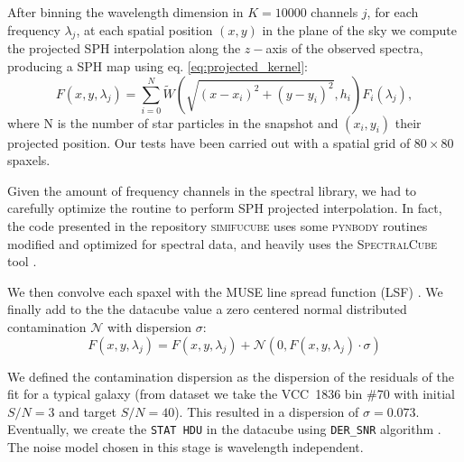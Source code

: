 After binning the wavelength dimension in $K=10000$ channels $j$, for each frequency $\lambda_j$, at each spatial position $(x,y)$ in the plane of the sky we compute the projected SPH interpolation along the $z-$axis of the observed spectra, producing a SPH map using eq. \eqref{eq:projected_kernel}:
\begin{equation}
  F(x,y, \lambda_j) = \sum_{i=0}^{N} \tilde{W} \left(\sqrt{(x-x_i)^2+(y-y_i)^2}, h_i \right) F_i(\lambda_j),
\end{equation}
where N is the number of star particles in the snapshot and $(x_i, y_i)$ their projected position.
Our tests have been carried out with a spatial grid of $80\times 80$ spaxels.

Given the amount of frequency channels in the spectral library, we had to carefully optimize the routine to perform SPH projected interpolation.
In fact, the code presented in the repository \textsc{simifucube} \citep{simifucube} uses some \textsc{pynbody} \citep{Pontzen2013} routines modified and optimized for spectral data, and heavily uses the \textsc{SpectralCube} tool \citep{SpectralCube}.

We then convolve each spaxel with the MUSE line spread function (LSF) \citep[$F_{\mathrm{udf}10}$, eq. (8) in][]{Bacon2017}.
We finally add to the the datacube value a zero centered normal distributed contamination $\mathcal{N}$ with dispersion $\sigma$:
\begin{equation}
  F(x,y, \lambda_j) = F(x,y, \lambda_j) + \mathcal{N}(0, F(x,y, \lambda_j)\cdot \sigma )
\end{equation}

We defined the contamination dispersion as the dispersion of the residuals of the fit for a typical galaxy (from \citet{Bidaran2020} dataset we take the VCC~1836 bin \#70 with initial $S/N=3$ and target $S/N=40$).
This resulted in a dispersion of $\sigma = 0.073$.
Eventually, we create the \verb|STAT HDU| in the datacube using \verb|DER_SNR| algorithm \citep{Stoehr2008}. The noise model chosen in this stage is wavelength independent.



